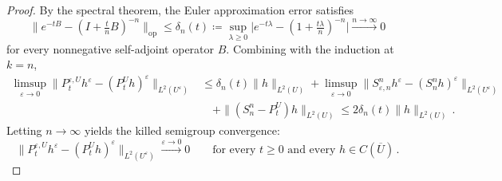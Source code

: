 \documentclass[11pt]{amsart}
\theoremstyle{plain}
\theoremstyle{definition}
\theoremstyle{remark}
\newcommand{\eps}{\varepsilon}
\begin{document}
\begin{proof}
		By the spectral theorem, the Euler approximation error satisfies
		\[
		\|e^{-tB} - (I + \tfrac{t}{n}B)^{-n}\|_{\mathrm{op}}
		\le \delta_n(t) \coloneqq \sup_{\lambda \ge 0}\bigl|e^{-t\lambda} - (1 + \tfrac{t\lambda}{n})^{-n}\bigr|
		\xrightarrow{n \to \infty} 0
		\]
		for every nonnegative self-adjoint operator $B$.
		Combining with the induction at $k = n$,
		\begin{align*}
			\limsup_{\eps \to 0}\|P_t^{\eps,U} h^\eps - (P_t^U h)^\eps\|_{L^2(U^\eps)}
			&\le \delta_n(t)\|h\|_{L^2(U)}
			+ \limsup_{\eps \to 0}\|S_{\eps,n}^n h^\eps - (S_n^n h)^\eps\|_{L^2(U^\eps)} \\
			&\quad + \|(S_n^n - P_t^U)h\|_{L^2(U)}
			\le 2\delta_n(t)\|h\|_{L^2(U)}\,.
		\end{align*}
		Letting $n \to \infty$ yields the killed semigroup convergence:
		\begin{equation}
			\label{e.semigroup.convergence}
			\|P_t^{\eps,U} h^\eps - (P_t^U h)^\eps\|_{L^2(U^\eps)} \xrightarrow{\eps \to 0} 0
			\qquad \text{for every } t \ge 0 \text{ and every } h \in C(\overline{U})\,.
		\end{equation}
		
		\smallskip
		

\end{proof}
\end{document}
